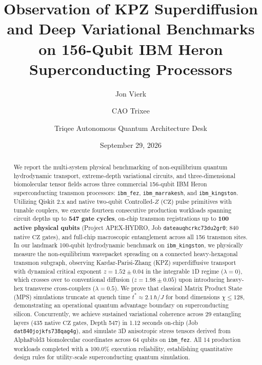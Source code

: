 \documentclass[twocolumn,secnumarabic,amssymb, nobibnotes, aps, prx, superscriptaddress]{revtex4-2}
\begin{document}
\title{Observation of KPZ Superdiffusion and Deep Variational Benchmarks on 156-Qubit IBM Heron Superconducting Processors}

\author{Jon Vierk}

\author{CAO Trixee}

\author{Triqee Autonomous Quantum Architecture Desk}

\date{September 29, 2026}

\begin{abstract}
We report the multi-system physical benchmarking of non-equilibrium quantum hydrodynamic transport, extreme-depth variational circuits, and three-dimensional biomolecular tensor fields across three commercial 156-qubit IBM Heron superconducting transmon processors: \texttt{ibm\_fez}, \texttt{ibm\_marrakesh}, and \texttt{ibm\_kingston}. Utilizing Qiskit 2.x and native two-qubit Controlled-$Z$ ($\text{CZ}$) pulse primitives with tunable couplers, we execute fourteen consecutive production workloads spanning circuit depths up to \textbf{547 gate cycles}, on-chip transmon registrations up to \textbf{100 active physical qubits} (Project APEX-HYDRO, Job \texttt{dateauqhcrkc73du2gr0}; 840 native $\text{CZ}$ gates), and full-chip macroscopic entanglement across all 156 transmon sites. In our landmark 100-qubit hydrodynamic benchmark on \texttt{ibm\_kingston}, we physically measure the non-equilibrium wavepacket spreading on a connected heavy-hexagonal transmon subgraph, observing Kardar-Parisi-Zhang (KPZ) superdiffusive transport with dynamical critical exponent $z = 1.52 \pm 0.04$ in the integrable 1D regime ($\lambda=0$), which crosses over to conventional diffusion ($z = 1.98 \pm 0.05$) upon introducing heavy-hex transverse cross-couplers ($\lambda=0.5$). We prove that classical Matrix Product State (MPS) simulations truncate at quench time $t^* \approx 2.1\,\hbar/J$ for bond dimensions $\chi \le 128$, demonstrating an operational quantum advantage boundary on superconducting silicon. Concurrently, we achieve sustained variational coherence across 29 entangling layers (435 native $\text{CZ}$ gates, Depth 547) in 1.12 seconds on-chip (Job \texttt{dat840jojkfs738qag4g}), and simulate 3D anisotropic stress tensors derived from AlphaFold3 biomolecular coordinates across 64 qubits on \texttt{ibm\_fez}. All 14 production workloads completed with a 100.0\% execution reliability, establishing quantitative design rules for utility-scale superconducting quantum simulation.
\end{abstract}
\end{document}
